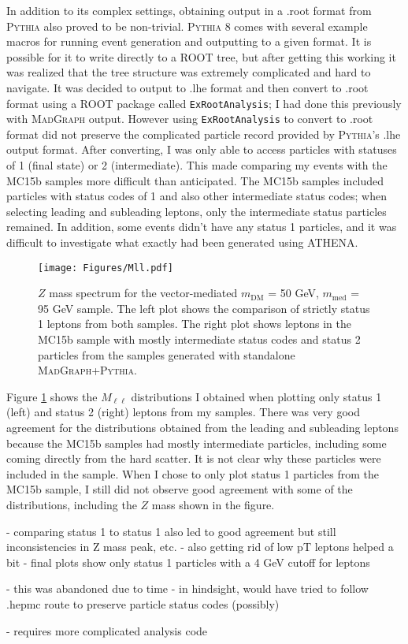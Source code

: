 In addition to its complex settings, obtaining output in a .root format from \textsc{Pythia} also proved to be non-trivial. \textsc{Pythia} 8 comes with several example macros for running event generation and outputting to a given format. It is possible for it to write directly to a ROOT tree, but after getting this working it was realized that the tree structure was extremely complicated and hard to navigate. It was decided to output to .lhe format and then convert to .root format using a ROOT package called \texttt{ExRootAnalysis}; I had done this previously with \textsc{MadGraph} output. However using \texttt{ExRootAnalysis} to convert to .root format did not preserve the complicated particle record provided by \textsc{Pythia}'s .lhe output format. After converting, I was only able to access particles with statuses of 1 (final state) or 2 (intermediate). This made comparing my events with the MC15b samples more difficult than anticipated. The MC15b samples included particles with status codes of 1 and also other intermediate status codes; when selecting leading and subleading leptons, only the intermediate status particles remained. In addition, some events didn't have any status 1 particles, and it was difficult to investigate what exactly had been generated using ATHENA.

\begin{figure}[h]
\centering
\texttt{[image: Figures/Mll.pdf]}
\caption{$Z$ mass spectrum for the vector-mediated $m_{\text{DM}}$ = 50 GeV, $m_{\text{med}}$ = 95 GeV sample. The left plot shows the comparison of strictly status 1 leptons from both samples. The right plot shows leptons in the MC15b sample with mostly intermediate status codes and status 2 particles from the samples generated with standalone \textsc{MadGraph}+\textsc{Pythia}.}
\label{fig:Mll}
\end{figure}

\noindent Figure \ref{fig:Mll} shows the $M_{\ell\ell}$ distributions I obtained when plotting only status 1 (left) and status 2 (right) leptons from my samples. There was very good agreement for the distributions obtained from the leading and subleading leptons because the MC15b samples had mostly intermediate particles, including some coming directly from the hard scatter. It is not clear why these particles were included in the sample. When I chose to only plot status 1 particles from the MC15b sample, I still did not observe good agreement with some of the distributions, including the $Z$ mass shown in the figure.

- comparing status 1 to status 1 also led to good agreement but still inconsistencies in Z mass peak, etc.
- also getting rid of low pT leptons helped a bit
- final plots show only status 1 particles with a 4 GeV cutoff for leptons

- this was abandoned due to time
- in hindsight, would have tried to follow .hepmc route to preserve particle status codes (possibly)

- requires more complicated analysis code